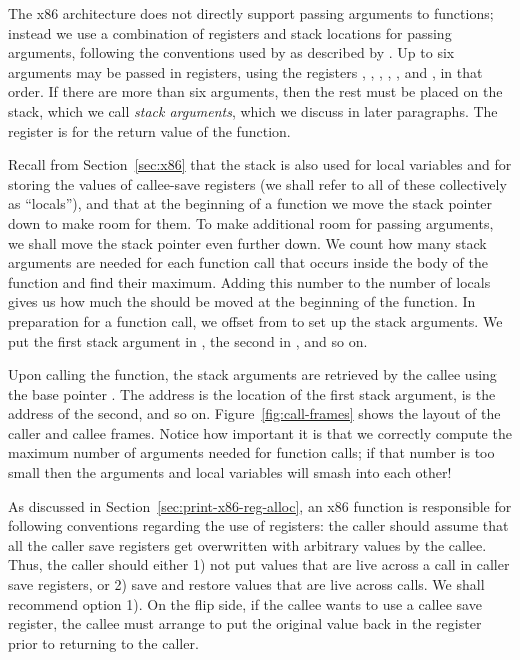 \documentclass[11pt]{book}
\begin{document}
The x86 architecture does not directly support passing arguments to
functions; instead we use a combination of registers and stack
locations for passing arguments, following the conventions used by
 as described by \cite{Matz:2013aa}. Up to six arguments may
be passed in registers, using the registers , ,
, , , and , in that order.  If
there are more than six arguments, then the rest must be placed on the
stack, which we call \emph{stack arguments}, which we discuss in later
paragraphs. The register  is for the return value of the
function.

Recall from Section~\ref{sec:x86} that the stack is also used for
local variables and for storing the values of callee-save registers
(we shall refer to all of these collectively as ``locals''), and that
at the beginning of a function we move the stack pointer 
down to make room for them.
To make additional room for passing arguments, we shall
move the stack pointer even further down. We count how many stack
arguments are needed for each function call that occurs inside the
body of the function and find their maximum. Adding this number to the
number of locals gives us how much the  should be moved at
the beginning of the function. In preparation for a function call, we
offset from  to set up the stack arguments. We put the first
stack argument in , the second in , and
so on.

Upon calling the function, the stack arguments are retrieved by the
callee using the base pointer . The address 
is the location of the first stack argument,  is the
address of the second, and so on. Figure~\ref{fig:call-frames} shows
the layout of the caller and callee frames. Notice how important it is
that we correctly compute the maximum number of arguments needed for
function calls; if that number is too small then the arguments and
local variables will smash into each other!

As discussed in Section~\ref{sec:print-x86-reg-alloc}, an x86 function
is responsible for following conventions regarding the use of
registers: the caller should assume that all the caller save registers
get overwritten with arbitrary values by the callee. Thus, the caller
should either 1) not put values that are live across a call in caller
save registers, or 2) save and restore values that are live across
calls. We shall recommend option 1).  On the flip side, if the callee
wants to use a callee save register, the callee must arrange to put
the original value back in the register prior to returning to the
caller.
\end{document}
